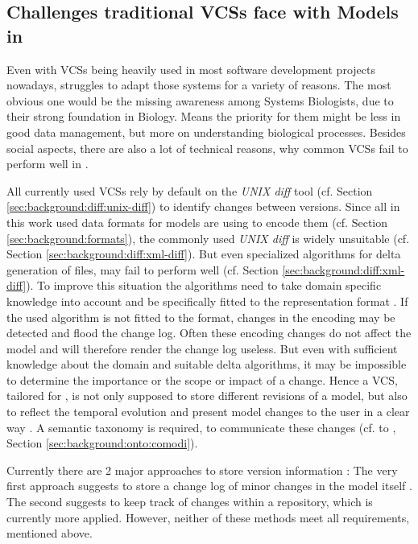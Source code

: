 	\subsection{Challenges traditional VCSs face with Models in \sysbio}
	\label{sec:background:manage-versions:challenges}
	
	Even with VCSs being heavily used in most software development projects nowadays, \sysbio struggles to adapt those systems for a variety of reasons.
	The most obvious one would be the missing awareness among Systems Biologists, due to their strong foundation in Biology. Means the priority for them might be less in good data management, but more on understanding biological processes.
	Besides social aspects, there are also a lot of technical reasons, why common VCSs fail to perform well in \sysbio.
	
	All currently used VCSs rely by default on the \emph{UNIX diff} tool (cf. Section \ref{sec:background:diff:unix-diff}) to identify changes between versions. Since all in this work used data formats for \sysbio models are using \xml to encode them (cf. Section \ref{sec:background:formats}), the commonly used \emph{UNIX diff} is widely unsuitable (cf. Section \ref{sec:background:diff:xml-diff}).
	But even specialized algorithms for delta generation of \xml files, may fail to perform well (cf. Section \ref{sec:background:diff:xml-diff}). To improve this situation the algorithms need to take domain specific knowledge into account and be specifically fitted to the representation format \citep{Waltemath2013}.
	If the used algorithm is not fitted to the format, changes in the encoding may be detected and flood the change log. Often these encoding changes do not affect the model and will therefore render the change log useless.
	But even with sufficient knowledge about the domain and suitable \xml delta algorithms, it may be impossible to determine the importance or the scope or impact of a change. Hence a VCS, tailored for \sysbio, is not only supposed to store different revisions of a model, but also to reflect the temporal evolution and present model changes to the user  in a clear way \citep{Waltemath2013}. A semantic taxonomy is required, to communicate these changes (cf. to \comodi, Section \ref{sec:background:onto:comodi}).
	
	Currently there are 2 major approaches to store version information \citep{Waltemath2013}:
	The very first approach suggests to store a change log of minor changes in the model itself \citep{Beard2009}.
	The second suggests to keep track of changes within a repository, which is currently more applied. However, neither of these methods meet all requirements, mentioned above.
	
